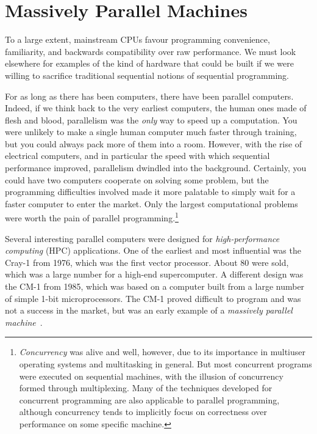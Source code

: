 \section{Massively Parallel Machines}
\label{sec:massively-parallel-machines}

To a large extent, mainstream CPUs favour programming convenience,
familiarity, and backwards compatibility over raw performance.  We
must look elsewhere for examples of the kind of hardware that could be
built if we were willing to sacrifice traditional sequential notions
of sequential programming.

For as long as there has been computers, there have been parallel
computers.  Indeed, if we think back to the very earliest computers,
the human ones made of flesh and blood, parallelism was the
\textit{only} way to speed up a computation.  You were unlikely to
make a single human computer much faster through training, but you
could always pack more of them into a room.  However, with the rise of
electrical computers, and in particular the speed with which
sequential performance improved, parallelism dwindled into the
background.  Certainly, you could have two computers cooperate on
solving some problem, but the programming difficulties involved made
it more palatable to simply wait for a faster computer to enter the
market.  Only the largest computational problems were worth the pain
of parallel programming.\footnote{\textit{Concurrency} was alive and
  well, however, due to its importance in multiuser operating systems
  and multitasking in general.  But most concurrent programs were
  executed on sequential machines, with the illusion of concurrency
  formed through multiplexing.  Many of the techniques developed for
  concurrent programming are also applicable to parallel programming,
  although concurrency tends to implicitly focus on correctness over
  performance on some specific machine.}

Several interesting parallel computers were designed for
\textit{high-performance computing} (HPC) applications.  One of the
earliest and most influential was the Cray-1 from 1976, which was the
first vector processor.  About 80 were sold, which was a large number
for a high-end supercomputer.  A different design was the CM-1 from
1985, which was based on a computer built from a large number of
simple 1-bit microprocessors.  The CM-1 proved difficult to program
and was not a success in the market, but was an early example of a
\textit{massively parallel machine}~\cite{hillis1989connection}.

